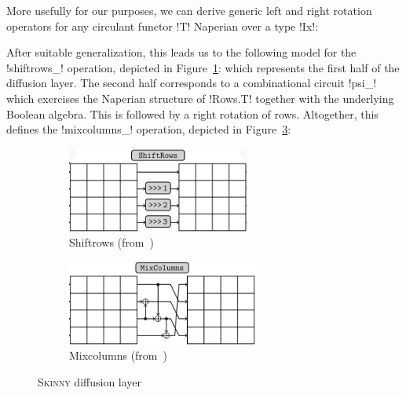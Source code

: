 \documentclass[draft,english]{jflart}
\newcommand{\ie}{\textit{i.e.}}
\newcommand{\Skinny}{\textsc{Skinny}}
\begin{document}
More usefully for our purposes, we can derive generic left and right
rotation operators for any circulant functor \coqe!T!  Naperian over a
type \coqe!Ix!:
%





After suitable generalization, this leads us to the following model
for the \coqe!shiftrows_! operation, depicted in
Figure~\ref{fig:shiftrows}:
%
%
which represents the first half of the diffusion layer.
%
%
The second half corresponds to a combinational circuit \coqe!psi_!
%
%
which exercises the Naperian structure of \coqe!Rows.T! together with
the underlying Boolean algebra. This is followed by a right rotation
of rows. Altogether, this defines the \coqe!mixcolumns_! operation,
depicted in Figure~\ref{fig:mixcolumns}:
%

\begin{figure}[tp]
  \centering
  \begin{subfigure}[t]{0.45\textwidth}
    \centering
    \includegraphics[draft=false,height=2.8cm]{shiftrows}
    \caption{Shiftrows (from~\citet{beierle:skinny})}
    \label{fig:shiftrows}
  \end{subfigure}
  \begin{subfigure}[t]{0.45\textwidth}
    \centering
    \includegraphics[draft=false,height=2.8cm]{mixcolumns}
    \caption{Mixcolumns (from~\citet{beierle:skinny})}
    \label{fig:mixcolumns}
  \end{subfigure}
  \caption{\Skinny{} diffusion layer}
\end{figure}
\end{document}
